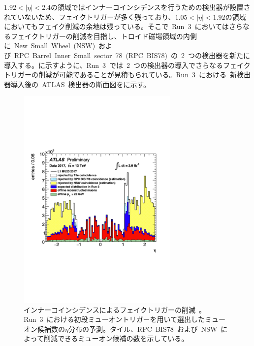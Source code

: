 $1.92<|\eta|<2.4$の領域ではインナーコインシデンスを行うための検出器が設置されていないため、フェイクトリガーが多く残っており、$1.05<|\eta|<1.92$の領域においてもフェイク削減の余地は残っている。そこで~Run~3~においてはさらなるフェイクトリガーの削減を目指し、トロイド磁場領域の内側に~New~Small~Wheel~(NSW)~および~RPC~Barrel~Inner~Small~sector~78~(RPC~BIS78)~の~2~つの検出器を新たに導入する。に示すように、Run~3~では~2~つの検出器の導入でさらなるフェイクトリガーの削減が可能であることが見積もられている。Run~3~における~新検出器導入後の~ATLAS~検出器の断面図をに示す。
\begin{figure}[tbp]
        \centering   
        \includegraphics[width=0.7\textwidth,page=1]{img/pdf/inner.pdf}
        \caption[インナーコインシデンスによるフェイクトリガーの削減]{インナーコインシデンスによるフェイクトリガーの削減~\cite{shiomi}。Run~3~における初段ミューオントリガーを用いて選出したミューオン候補数の$\eta$分布の予測。タイル、RPC~BIS78~および~NSW~によって削減できるミューオン候補の数を示している。}
        \label{fig:innercoin}
\end{figure}
